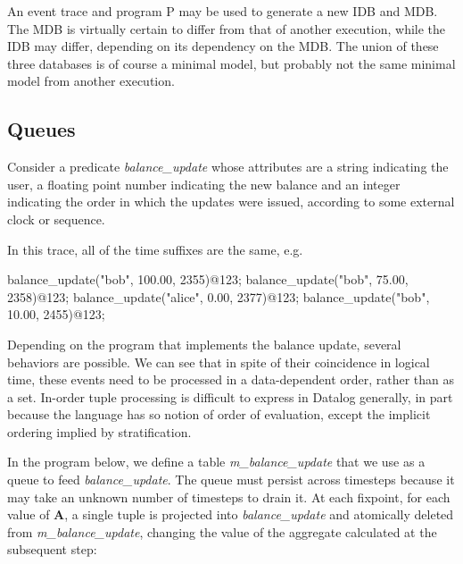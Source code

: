 An event trace and program P may be used to generate a new IDB and MDB.  The MDB is virtually certain to differ from that of another
execution, while the IDB may differ, depending on its dependency on the MDB.  The union of these three databases is of course a
minimal model, but probably not the same minimal model from another execution.  






\subsection{Queues}

Consider a predicate \emph{balance\_update} whose attributes are a string indicating the user, a floating point number
indicating the new balance and an integer indicating the order in which the updates were issued, according to some 
external clock or sequence.  

In this trace, all of the time suffixes are the same, e.g.

\begin{Dedalus}
balance\_update("bob", 100.00, 2355)@123;
balance\_update("bob", 75.00, 2358)@123;
balance\_update("alice", 0.00, 2377)@123;
balance\_update("bob", 10.00, 2455)@123;
\end{Dedalus}

Depending on the program that implements the balance update, several behaviors are possible.  We can see that in spite of their
coincidence in logical time, these events need to be processed in a data-dependent order, rather than as a set.  In-order tuple 
processing is difficult to express in Datalog generally, in part because the language has so notion of order of evaluation, except
the implicit ordering implied by stratification.

In the program below, we define a table \emph{m\_balance\_update} that we use as a queue to feed \emph{balance\_update}.  The queue must persist across
timesteps because it may take an unknown number of timesteps to drain it.  At each fixpoint, for each value of \textbf{A}, a single
tuple is projected into \emph{balance\_update} and atomically deleted from \emph{m\_balance\_update}, changing the value of the aggregate calculated at the
subsequent step:



